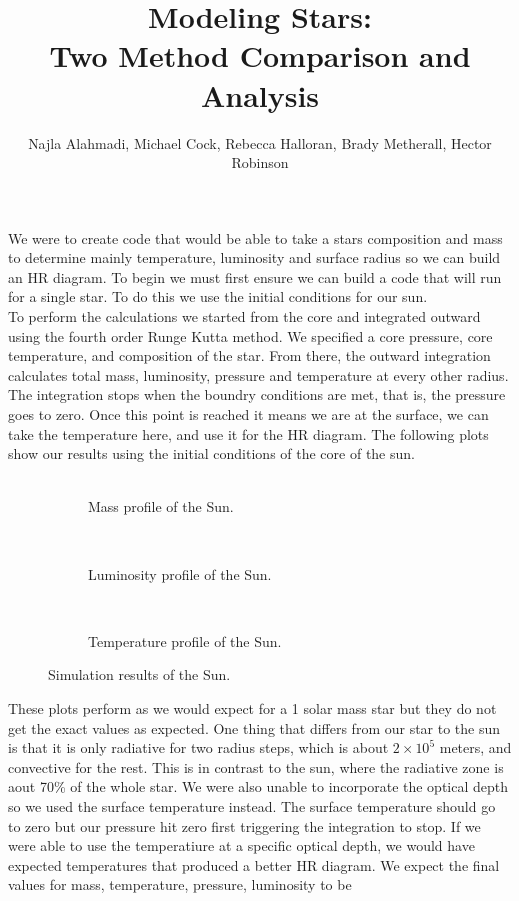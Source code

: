 \documentclass[10pt]{article}
\title{Modeling Stars: \\ Two Method Comparison and Analysis}
\author{Najla Alahmadi, Michael Cock, Rebecca Halloran, Brady Metherall, Hector Robinson}
\begin{document}
\maketitle

We were to create code that would be able to take a stars composition and mass to determine mainly temperature, luminosity and surface radius so we can build an HR diagram. To begin we must first ensure we can build a code that will run for a single star. To do this we use the initial conditions for our sun. \\

To perform the calculations we started from the core and integrated outward using the fourth order Runge Kutta method. We specified a core pressure, core temperature, and composition of the star. From there, the outward integration calculates total mass, luminosity, pressure and temperature at every other radius. The integration stops when the boundry conditions are met, that is, the pressure goes to zero. Once this point is reached it means we are at the surface, we can take the temperature here, and use it for the HR diagram. The following plots show our results using the initial conditions of the core of the sun. \\
\

\begin{figure}[p]
\begin{centering}
 \begin{subfigure}{\textwidth}
  
  \caption{Mass profile of the Sun.}
 \end{subfigure} \\
 \begin{subfigure}{\textwidth}
  
  \caption{Luminosity profile of the Sun.}
 \end{subfigure} \\
  \begin{subfigure}{\textwidth}
  
  \caption{Temperature profile of the Sun.}
 \end{subfigure}
 \caption{Simulation results of the Sun.}
 \end{centering}
\end{figure}

These plots perform as we would expect for a 1 solar mass star but they do not get the exact values as expected. One thing that differs from our star to the sun is that it is only radiative for two radius steps, which is about $2\times 10^5$ meters, and convective for the rest. This is in contrast to the sun, where the radiative zone is aout 70\% of the whole star. We were also unable to incorporate the optical depth so we used the surface temperature instead. The surface temperature should go to zero but our pressure hit zero first triggering the integration to stop. If we were able to use the temperatiure at a specific optical depth, we would have expected temperatures that produced a better HR diagram. We expect the final values for mass, temperature, pressure, luminosity to be \\
\end{document}
